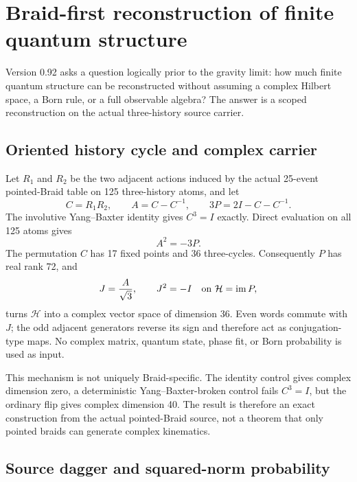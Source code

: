 \documentclass[11pt]{article}
\theoremstyle{definition}
\theoremstyle{remark}
\begin{document}
\section{Braid-first reconstruction of finite quantum structure}\label{sec:quantumreconstruction091}

Version 0.92 asks a question logically prior to the gravity limit: how much finite quantum structure can be reconstructed without assuming a complex Hilbert space, a Born rule, or a full observable algebra? The answer is a scoped reconstruction on the actual three-history source carrier.

\subsection{Oriented history cycle and complex carrier}

Let $R_1$ and $R_2$ be the two adjacent actions induced by the actual 25-event pointed-Braid table on 125 three-history atoms, and let
\begin{equation}
 C=R_1R_2,\qquad
 A=C-C^{-1},\qquad
 3P=2I-C-C^{-1}.
\end{equation}
The involutive Yang--Baxter identity gives $C^3=I$ exactly. Direct evaluation on all 125 atoms gives
\begin{equation}
 A^2=-3P.
\end{equation}
The permutation $C$ has 17 fixed points and 36 three-cycles. Consequently $P$ has real rank 72, and
\begin{equation}
 J=\frac{A}{\sqrt3},\qquad J^2=-I\quad\hbox{on }\mathcal H=\operatorname{im}P,
\end{equation}
turns $\mathcal H$ into a complex vector space of dimension 36. Even words commute with $J$; the odd adjacent generators reverse its sign and therefore act as conjugation-type maps. No complex matrix, quantum state, phase fit, or Born probability is used as input.

This mechanism is not uniquely Braid-specific. The identity control gives complex dimension zero, a deterministic Yang--Baxter-broken control fails $C^3=I$, but the ordinary flip gives complex dimension 40. The result is therefore an exact construction from the actual pointed-Braid source, not a theorem that only pointed braids can generate complex kinematics.

\subsection{Source dagger and squared-norm probability}
\end{document}
